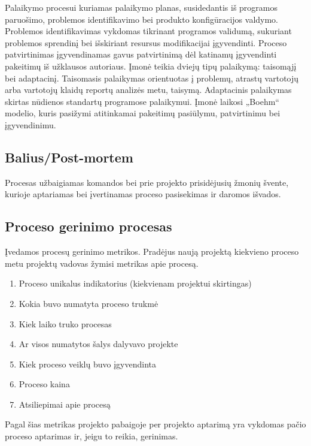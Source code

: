 \documentclass{VUMIFPSkursinis}
\begin{document}
	Palaikymo procesui kuriamas palaikymo planas, susidedantis iš programos paruošimo, problemos identifikavimo bei produkto konfigūracijos valdymo.
	Problemos identifikavimas vykdomas tikrinant programos validumą, sukuriant problemos sprendinį bei išskiriant resursus modifikacijai įgyvendinti.
	Proceso patvirtinimas įgyvendinamas gavus patvirtinimą dėl katinamų įgyvendinti pakeitimų iš užklausos autoriaus.
	Įmonė teikia dviejų tipų palaikymą: taisomąjį bei adaptacinį. Taisomasis palaikymas orientuotas į problemų, atrastų vartotojų arba vartotojų klaidų reportų analizės metu, taisymą.
	Adaptacinis palaikymas skirtas nūdienos standartų programose palaikymui. Įmonė laikosi „Boehm“ modelio, kuris pasižymi atitinkamai pakeitimų pasiūlymu, patvirtinimu bei įgyvendinimu.
	\label{img:boehmsModel}

	\subsection{Balius/Post-mortem}
	Procesas užbaigiamas komandos bei prie projekto prisidėjusių žmonių švente, kurioje aptariamas bei įvertinamas proceso pasisekimas ir daromos išvados.

	\subsection{Proceso gerinimo procesas}
		Įvedamos procesų gerinimo metrikos.
		Pradėjus naują projektą kiekvieno proceso metu projektų vadovas žymisi metrikas apie procesą.
			\begin{enumerate}
				\item{Proceso unikalus indikatorius (kiekvienam projektui skirtingas)}
				\item{Kokia buvo numatyta proceso trukmė}
				\item{Kiek laiko truko procesas}
				\item{Ar visos numatytos šalys dalyvavo projekte}
				\item{Kiek proceso veiklų buvo įgyvendinta}
				\item{Proceso kaina}
				\item{Atsiliepimai apie procesą}
			\end{enumerate}
		Pagal šias metrikas projekto pabaigoje per projekto aptarimą yra vykdomas pačio proceso aptarimas ir, jeigu to reikia, gerinimas.
\end{document}
